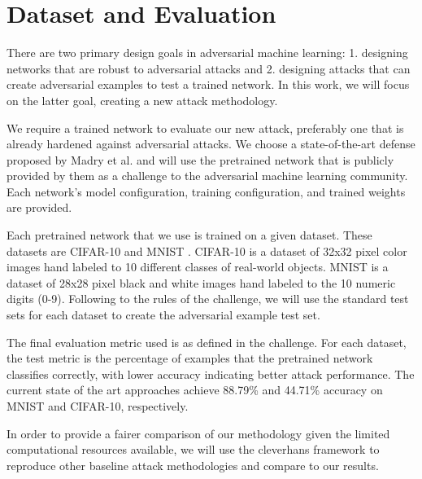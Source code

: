 \section{Dataset and Evaluation}

There are two primary design goals in adversarial machine learning: 1. designing networks that are robust to adversarial attacks and 2. designing attacks that can create adversarial examples to test a trained network. In this work, we will focus on the latter goal, creating a new attack methodology.

We require a trained network to evaluate our new attack, preferably one that is already hardened against adversarial attacks. We choose a state-of-the-art defense proposed by Madry et al. \cite{madry2017towards} and will use the pretrained network that is publicly provided by them as a challenge to the adversarial machine learning community. Each network's model configuration, training configuration, and trained weights are provided.

Each pretrained network that we use is trained on a given dataset. These datasets are CIFAR-10 \cite{krizhevsky2009learning} and MNIST \cite{lecun1998gradient}. CIFAR-10 is a dataset of 32x32 pixel color images hand labeled to 10 different classes of real-world objects. MNIST is a dataset of 28x28 pixel black and white images hand labeled to the 10 numeric digits (0-9). Following to the rules of the challenge, we will use the standard test sets for each dataset to create the adversarial example test set.

The final evaluation metric used is as defined in the challenge. For each dataset, the test metric is the percentage of examples that the pretrained network classifies correctly, with lower accuracy indicating better attack performance. The current state of the art approaches achieve 88.79\% and 44.71\% accuracy on MNIST and CIFAR-10, respectively.

In order to provide a fairer comparison of our methodology given the limited computational resources available, we will use the cleverhans \cite{GoodfellowPM16} framework to reproduce other baseline attack methodologies and compare to our results.
